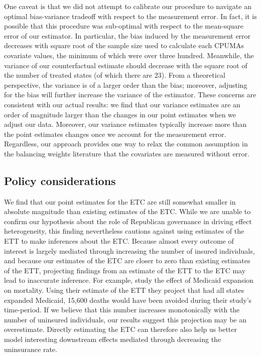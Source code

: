 \documentclass[aoas]{imsart}
\theoremstyle{plain}
\theoremstyle{remark}
\begin{document}
One caveat is that we did not attempt to calibrate our procedure to navigate an optimal bias-variance tradeoff with respect to the measurement error. In fact, it is possible that this procedure was sub-optimal with respect to the mean-square error of our estimator. In particular, the bias induced by the measurement error decreases with square root of the sample size used to calculate each CPUMAs covariate values, the minimum of which were over three hundred. Meanwhile, the variance of our counterfactual estimate should decrease with the square root of the number of treated states (of which there are 23). From a theoretical perspective, the variance is of a larger order than the bias; moreover, adjusting for the bias will further increase the variance of the estimator. These concerns are consistent with our actual results: we find that our variance estimates are an order of magnitude larger than the changes in our point estimates when we adjust our data. Moreover, our variance estimates typically increase more than the point estimates changes once we account for the measurement error. Regardless, our approach provides one way to relax the common assumption in the balancing weights literature that the covariates are measured without error. 

\subsection{Policy considerations}

We find that our point estimates for the ETC are still somewhat smaller in absolute magnitude than existing estimates of the ETC. While we are unable to confirm our hypothesis about the role of Republican governance in driving effect heterogeneity, this finding nevertheless cautions against using estimates of the ETT to make inferences about the ETC. Because almost every outcome of interest is largely mediated through increasing the number of insured individuals, and because our estimates of the ETC are closer to zero than existing estimates of the ETT, projecting findings from an estimate of the ETT to the ETC may lead to inaccurate inference. For example, \cite{miller2019medicaid} study the effect of Medicaid expansion on mortality. Using their estimate of the ETT they project that had all states expanded Medicaid, 15,600 deaths would have been avoided during their study's time-period. If we believe that this number increases monotonically with the number of uninsured individuals, our results suggest this projection may be an overestimate. Directly estimating the ETC can therefore also help us better model interesting downstream effects mediated through decreasing the uninsurance rate. 
\end{document}

